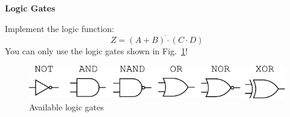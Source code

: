 \question[3]
%
\textbf{Logic Gates}

Implement the logic function: $$Z=\overline{(A+B)\cdot(C\cdot D)}$$ You can only
use the logic gates shown in Fig.~\ref{fig:gates}!

\begin{figure}[h]
	\centering
		\includegraphics{images/gates.pdf}
	\caption{Available logic gates}
	\label{fig:gates}
\end{figure}
